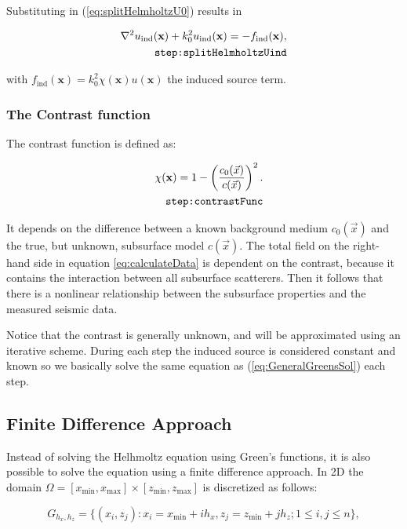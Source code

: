 \documentclass[10pt,a4paper]{article}
\begin{document}
Substituting in (\ref{eq:splitHelmholtzU0}) results in

\begin{align} \label{eq:splitHelmholtzUind}
\nabla^2 u_\text{ind}(\mathbf{x}) + k_0^2 u_\text{ind}(\mathbf{x}) =
-f_\text{ind}(\mathbf{x}),\\
\tag*{\texttt{step:splitHelmholtzUind}}
\end{align}

with $f_\text{ind}(\mathbf{x}) = k_0^2 \chi(\mathbf{x}) u(\mathbf{x})$
the induced source term.

\subsubsection{The Contrast function}
The contrast function is defined as:

\begin{align} \label{eq:contrastFunc}\chi(\mathbf{x}) = 1 -
\left(\frac{c_0(\vec{x})}{c(\vec{x})} \right)^2.\\
\tag*{\texttt{step:contrastFunc}}
\end{align}

It depends on the difference between a known background medium
$c_\text{0}(\vec{x})$ and the true, but unknown, subsurface model
$c(\vec{x})$. The total field on the right-hand side in equation
\ref{eq:calculateData} is dependent on the contrast, because it contains the
interaction between all subsurface scatterers. Then it follows that
there is a nonlinear relationship between the subsurface properties
and the measured seismic data.

Notice that the contrast is generally unknown, and will be
approximated using an iterative scheme. During each step the induced
source is considered constant and known so we basically solve the same
equation as (\ref{eq:GeneralGreensSol}) each step.

\subsection{Finite Difference Approach}
Instead of solving the Helhmoltz equation using Green's functions, it is also possible to solve the equation using a finite difference approach. In 2D the domain $\Omega=[x_{\min},x_{\max}]\times [z_{\min},z_{\max}]$ is discretized as follows:

\begin{equation}
G_{h_x,h_z} = \{(x_i,z_j): x_i = x_{\min}+ ih_x, z_j=z_{\min}+jh_z; 1\leq i,j\leq n\},
\end{equation} 
\end{document}
